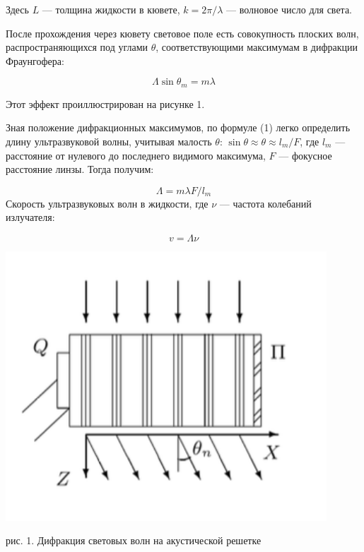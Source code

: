 \documentclass[a4paper,12pt]{article}
\begin{document}
	Здесь $ L $ --- толщина жидкости в кювете, $ k = 2 \pi / \lambda $ --- волновое число для света.
	
	После прохождения через кювету световое поле есть совокупность плоских волн, распространяющихся под углами $ \theta $, соответствующими максимумам в дифракции Фраунгофера:
	
	\begin{minipage}{0.47\textwidth}
		\begin{equation}\label{}	
			\Lambda \sin \theta_m = m \lambda
		\end{equation}
		
		Этот эффект проиллюстрирован на рисунке 1.
		
		Зная положение дифракционных максимумов, по формуле (1) легко определить длину ультразвуковой волны, учитывая малость $ \theta $: $ \sin \theta \approx \theta \approx l_m /F  $, где $ l_m $ --- расстояние от нулевого до последнего видимого максимума, $ F $ --- фокусное расстояние линзы. Тогда получим:
		
		\begin{equation}\label{}
			\Lambda = m \lambda F/ l_m 
		\end{equation}
		Скорость ультразвуковых волн в жидкости, где $ \nu $ --- частота колебаний излучателя:
		
		\begin{equation}\label{}
			v = \Lambda \nu 
		\end{equation}
		
		
	\end{minipage}	
	\begin{minipage}{0.47\textwidth}
		\begin{center}
			
			\includegraphics[width=0.9\textwidth]{1.png}
			
			{рис. 1. Дифракция световых волн на акустической решетке}
		\label{diff}
		
	\end{center}
	
\end{minipage}	
\end{document}
